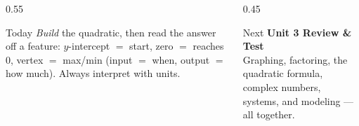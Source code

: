\documentclass[aspectratio=169, 11pt]{beamer}
\begin{document}
\begin{frame}[t, plain]
  \begin{columns}[T]
    \begin{column}{0.55\textwidth}
      \begin{block}{Today}
        \emph{Build} the quadratic, then read the answer off a feature: $y$-intercept $=$ start, zero $=$ reaches
        $0$, vertex $=$ max/min (input $=$ when, output $=$ how much). Always interpret with units.
      \end{block}
    \end{column}
    \begin{column}{0.45\textwidth}
      \begin{block}{Next}
        \textbf{Unit 3 Review \& Test}
        \\[2pt]
        Graphing, factoring, the quadratic formula, complex numbers, systems, and modeling --- all together.
      \end{block}
    \end{column}
  \end{columns}
\end{frame}
\end{document}
